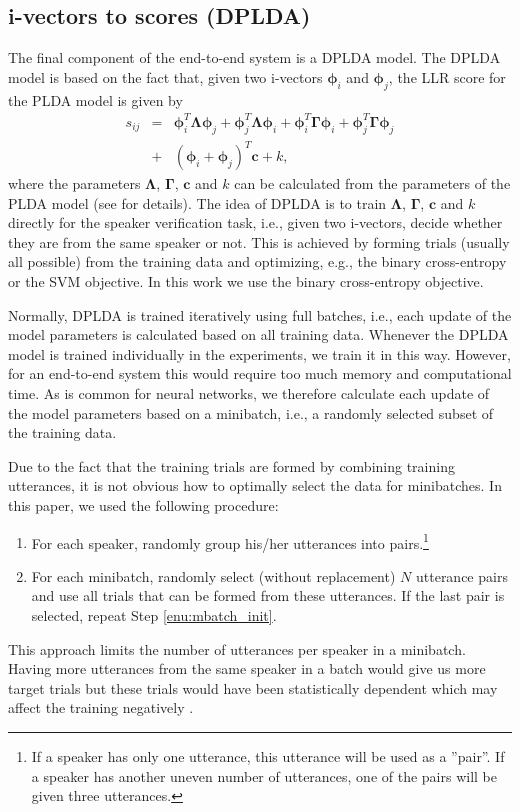 \documentclass{article}
\begin{document}
\subsection{i-vectors to scores (DPLDA)}
\label{subsec:DPLDA}
The final component of the end-to-end system is a DPLDA \cite{BurgetL_ICASSP:2011,Cumani-pairwise} model. The DPLDA model is based on the fact that, given two i-vectors $\bm{\phi}_i$ and $\bm{\phi}_j$, the LLR score for the PLDA model is given by
\begin{eqnarray}
s_{ij}&=&\bm{\phi}_{i}^{T}\bm{\Lambda}\bm{\phi}_{j} +
         \bm{\phi}_{j}^{T}\bm{\Lambda}\bm{\phi}_{i} +
         \bm{\phi}_{i}^{T}\bm{\Gamma}\bm{\phi}_{i} + \bm{\phi}_{j}^{T}\bm{\Gamma}\bm{\phi}_{j} \nonumber \\
&+& (\bm{\phi}_i + \bm{\phi}_j)^T\bm{c} + k,
\label{DPLDA_scoring}
\end{eqnarray}
where the parameters $\bm{\Lambda}$, $\bm{\Gamma}$, $\bm{c}$ and $k$ can be calculated from the parameters of the PLDA model (see \cite{BurgetL_ICASSP:2011} for details). The idea of DPLDA is to train $\bm{\Lambda}$, $\bm{\Gamma}$, $\bm{c}$ and $k$ directly for the speaker verification task, i.e., given two i-vectors, decide whether they are from the same speaker or not. This is achieved by forming trials (usually all possible) from the training data and optimizing, e.g., the binary cross-entropy or the SVM objective. In this work we use the binary cross-entropy objective.

Normally, DPLDA is trained iteratively using full batches, i.e., each update of the model parameters is calculated based on all training data. Whenever the DPLDA model is trained individually in the experiments, we train it in this way. However, for an end-to-end system this would require too much memory and computational time. As is common for neural networks, we therefore calculate each update of the model parameters based on a minibatch, i.e., a randomly selected subset of the training data. 

Due to the fact that the training trials are formed by combining training utterances, it is not obvious how to optimally select the data for minibatches. 
In this paper, we used the following procedure:
\begin{enumerate}
\item 
	\label{enu:mbatch_init}
	For each speaker, randomly group his/her utterances into pairs.\footnote{If a speaker has only one utterance, this utterance will be used as a ''pair''. If a speaker has another uneven number of utterances, one of the pairs will be given three utterances.}
\item
	For each minibatch, randomly select (without replacement) $N$ utterance pairs and use all trials that can be formed from these utterances. If the last pair is selected, repeat Step \ref{enu:mbatch_init}.
\end{enumerate}
This approach limits the number of utterances per speaker in a minibatch. Having more utterances from the same speaker in a batch would give us more target trials but these trials would have been statistically dependent which may affect the training negatively \cite{Rohdin2016}.
\end{document}
